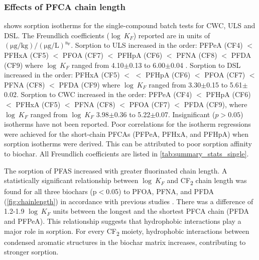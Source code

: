 \subsubsection{Effects of PFCA chain length}
 shows sorption isotherms for the single-compound batch tests for CWC, ULS and DSL. The Freundlich coefficients ($\log~K_F$) reported are in units of $\mathrm{(\mu g/kg)/(\mu g/L)^{n_F}}$. Sorption to ULS increased in the order: PFPeA (CF4) $<$ PFHxA (CF5) $<$ PFOA (CF7) $<$ PFHpA (CF6) $<$ PFNA (CF8) $<$ PFDA (CF9) where $\log~K_F$ ranged from 4.10$\pm$0.13 to 6.00$\pm$0.04 . Sorption to DSL increased in the order: PFHxA (CF5) $<$ $<$ PFHpA (CF6) $<$ PFOA (CF7) $<$ PFNA (CF8) $<$ PFDA (CF9) where $\log~K_F$ ranged from 3.30$\pm$0.15 to 5.61$\pm$0.02. Sorption to CWC increased in the order: PFPeA (CF4) $<$ PFHpA (CF6) $<$ PFHxA (CF5) $<$ PFNA (CF8) $<$ PFOA (CF7) $<$ PFDA (CF9), where $\log~K_F$ ranged from $\log~K_F$ 3.98$\pm$0.36 to 5.22$\pm$0.07. Insignificant ($p>0.05$) isotherms have not been reported. Poor correlations for the isotherm regressions were achieved for the short-chain PFCAs (PFPeA, PFHxA, and PFHpA) when sorption isotherms were derived. This can be attributed to poor sorption affinity to biochar. All Freundlich coefficients are listed in \cref{tab:summary_stats_single}. 

The sorption of PFAS increased with greater fluorinated chain length. A statistically significant relationship between $\log~K_F$ and CF\textsubscript{2} chain length was found for all three biochars (p$<$0.05) to PFOA, PFNA, and PFDA (\cref{fig:chainlength}) in accordance with previous studies \citep{Sorengard2019, fabregat2022examining, ahmed2020per}. There was a difference of 1.2-1.9 $\log~K_F$ units between the longest and the shortest PFCA chain (PFDA and PFPeA). This relationship suggests that hydrophobic interactions play a major role in sorption. For every CF\textsubscript{2} moiety, hydrophobic interactions between condensed aromatic structures in the biochar matrix increases, contributing to stronger sorption. 

